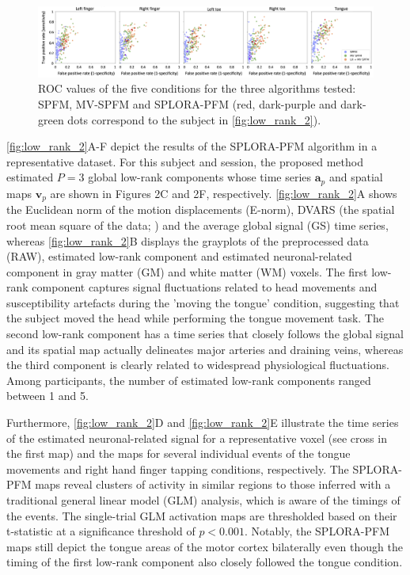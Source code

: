 \begin{figure}[th!]
    \centering
    \includegraphics[width=\textwidth]{figures/low_rank/figure_3.png}
    \caption{ROC values of the five conditions for the three algorithms tested:
    SPFM, MV-SPFM and SPLORA-PFM (red, dark-purple and dark-green dots
    correspond to the subject in \cref{fig:low_rank_2}).}
    \label{fig:low_rank_3}
\end{figure}


\cref{fig:low_rank_2}A-F depict the results of the SPLORA-PFM algorithm in a
representative dataset. For this subject and session, the proposed method
estimated $P=3$ global low-rank components whose time series $\mathbf{a}_p$ and
spatial maps $\mathbf{v}_p$ are shown in Figures 2C and 2F, respectively.
\cref{fig:low_rank_2}A shows the Euclidean norm of the motion displacements
(E-norm), DVARS (the spatial root mean square of the data;
\cite{Smyser2011FunctionalconnectivityMRI,Power2012Spurioussystematiccorrelations})
and the average global signal (GS) time series, whereas \cref{fig:low_rank_2}B
displays the grayplots of the preprocessed data (RAW), estimated low-rank
component and estimated neuronal-related component in gray matter (GM) and white
matter (WM) voxels. The first low-rank component captures signal fluctuations
related to head movements and susceptibility artefacts during the 'moving the
tongue' condition, suggesting that the subject moved the head while performing
the tongue movement task. The second low-rank component has a time series that
closely follows the global signal and its spatial map actually delineates major
arteries and draining veins, whereas the third component is clearly related to
widespread physiological fluctuations. Among participants, the number of
estimated low-rank components ranged between 1 and 5.

Furthermore, \cref{fig:low_rank_2}D and \cref{fig:low_rank_2}E illustrate the
time series of the estimated neuronal-related signal for a representative voxel
(see cross in the first map) and the maps for several individual events of the
tongue movements and right hand finger tapping conditions, respectively. The
SPLORA-PFM maps reveal clusters of activity in similar regions to those inferred
with a traditional general linear model (GLM) analysis, which is aware of the
timings of the events. The single-trial GLM activation maps are thresholded
based on their t-statistic at a significance threshold of $p < 0.001$. Notably,
the SPLORA-PFM maps still depict the tongue areas of the motor cortex
bilaterally even though the timing of the first low-rank component also closely
followed the tongue condition.

